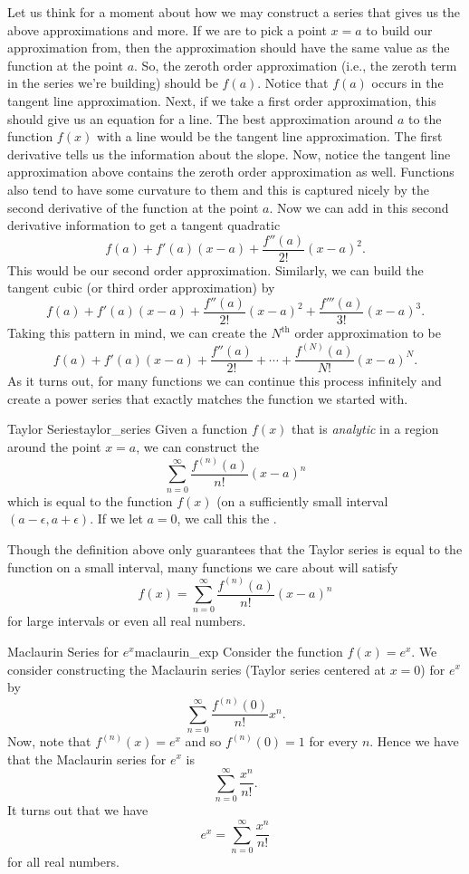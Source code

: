 Let us think for a moment about how we may construct a series that gives us the above approximations and more.  If we are to pick a point $x=a$ to build our approximation from, then the approximation should have the same value as the function at the point $a$.  So, the zeroth order approximation (i.e., the zeroth term in the series we're building) should be $f(a)$.  Notice that $f(a)$ occurs in the tangent line approximation.  Next, if we take a first order approximation, this should give us an equation for a line. The best approximation around $a$ to the function $f(x)$ with a line would be the tangent line approximation.  The first derivative tells us the information about the slope.  Now, notice the tangent line approximation above contains the zeroth order approximation as well. Functions also tend to have some curvature to them and this is captured nicely by the second derivative of the function at the point $a$.  Now we can add in this second derivative information to get a tangent quadratic
\[
f(a)+f'(a)(x-a)+\frac{f''(a)}{2!}(x-a)^2.
\]
This would be our second order approximation. Similarly, we can build the tangent cubic (or third order approximation) by
\[
f(a)+f'(a)(x-a)+\frac{f''(a)}{2!}(x-a)^2+\frac{f'''(a)}{3!}(x-a)^3.
\]
Taking this pattern in mind, we can create the $N^\textrm{th}$ order approximation to be
\[
f(a)+f'(a)(x-a)+\frac{f''(a)}{2!}+\cdots + \frac{f^{(N)}(a)}{N!}(x-a)^N.
\]
As it turns out, for many functions we can continue this process infinitely and create a power series that exactly matches the function we started with.

\begin{df}{Taylor Series}{taylor_series}
Given a function $f(x)$ that is \emph{analytic} in a region around the point $x=a$, we can construct the 
\[
\sum_{n=0}^\infty \frac{f^{(n)}(a)}{n!}(x-a)^n
\]
which is equal to the function $f(x)$ (on a sufficiently small interval $(a-\epsilon, a+\epsilon)$. If we let $a=0$, we call this the .
\end{df}

Though the definition above only guarantees that the Taylor series is equal to the function on a small interval, many functions we care about will satisfy
\[
f(x)=\sum_{n=0}^\infty \frac{f^{(n)}(a)}{n!}(x-a)^n
\]
for large intervals or even all real numbers.

\begin{ex}{Maclaurin Series for $e^x$}{maclaurin_exp}
Consider the function $f(x)=e^x$.  We consider constructing the Maclaurin series (Taylor series centered at $x=0$) for $e^x$ by
\[
\sum_{n=0}^\infty \frac{f^{(n)}(0)}{n!}x^n.
\]
Now, note that $f^{(n)}(x)=e^x$ and so $f^{(n)}(0)=1$ for every $n$.  Hence we have that the Maclaurin series for $e^x$ is
\[
\sum_{n=0}^\infty \frac{x^n}{n!}.
\]
It turns out that we have
\[
e^x = \sum_{n=0}^\infty \frac{x^n}{n!}
\]
for all real numbers.
\end{ex}

